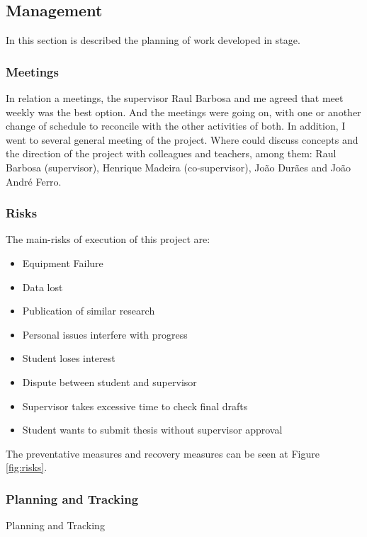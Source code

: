 \newpage
\subsection{Management}

In this section is described the planning of work developed in stage.

\subsubsection{Meetings}
In relation a meetings, the supervisor Raul Barbosa and me agreed that meet weekly was the best option. And the meetings were going on, with one or another change of schedule to reconcile with the other activities of both. In addition, I went to several general meeting of the project. Where could discuss concepts and the direction of the project with colleagues and teachers, among them: Raul Barbosa (supervisor), Henrique Madeira (co-supervisor), João Durães and João André Ferro.

\subsubsection{Risks}

The main-risks of execution of this project are:

\begin{itemize}
	\item Equipment Failure
	\item Data lost
	\item Publication of similar research
	\item Personal issues interfere with progress
	\item Student loses interest
	\item Dispute between student and supervisor
	\item Supervisor takes excessive time to check final drafts
	\item Student wants to submit thesis without supervisor approval
\end{itemize}


The preventative measures and recovery measures can be seen at Figure \ref{fig:risks}.

\subsubsection{Planning and Tracking}
Planning and Tracking

